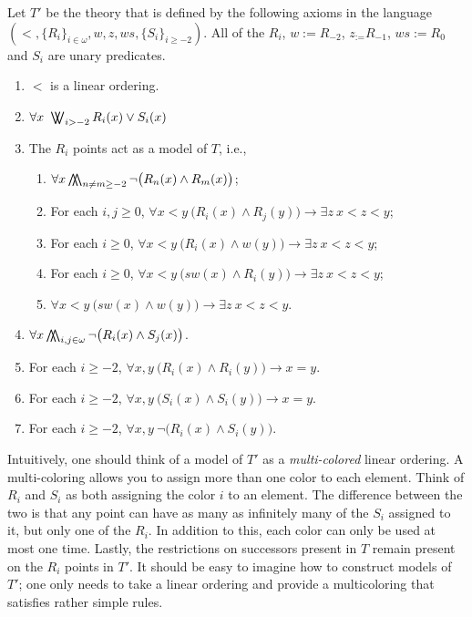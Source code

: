 \documentclass[11pt]{amsart}
\theoremstyle{definition}
\newcommand{\bigwwedge}{%
  \mathop{
    \mathchoice{\bigwedge\mkern-15mu\bigwedge}
               {\bigwedge\mkern-12.5mu\bigwedge}
               {\bigwedge\mkern-12.5mu\bigwedge}
               {\bigwedge\mkern-11mu\bigwedge}
    }
}
\newcommand{\bigvvee}{%
  \mathop{
    \mathchoice{\bigvee\mkern-15mu\bigvee}
               {\bigvee\mkern-12.5mu\bigvee}
               {\bigvee\mkern-12.5mu\bigvee}
               {\bigvee\mkern-11mu\bigvee}
    }
}
\begin{document}
\begin{definition}
    Let $T'$ be the theory that is defined by the following axioms in the language $(<,\{R_i\}_{i\in\omega},w,z,ws,\{S_i\}_{i\geq-2})$. All of the $R_i$, $w:=R_{-2}$, $z_:=R_{-1}$, $ws:=R_0$ and $S_i$ are unary predicates.
    \begin{enumerate}
        \item $<$ is a linear ordering.
        \item $\forall x ~ \bigvvee_{i>-2} R_i(x)\lor S_i(x)$
	\item The $R_i$ points act as a model of $T$, i.e.,
        \begin{enumerate}
            \item  $\forall x \bigwwedge_{n\neq m\geq -2} \lnot\big(R_n(x) \land R_m(x)\big)$;
            \item For each $i,j\geq 0$, $\forall x<y ~ \big(R_i(x) \land R_j(y)\big)\to \exists z ~ x<z<y$;
	    \item For each $i\geq 0$, $\forall x<y ~ \big(R_i(x) \land w(y)\big)\to \exists z ~ x<z<y$;
	    \item For each $i\geq 0$, $\forall x<y ~ \big(sw(x) \land R_i(y)\big)\to \exists z ~ x<z<y$;
            \item $\forall x<y ~ \big(sw(x) \land w(y)\big)\to \exists z ~ x<z<y$.
        \end{enumerate}
        \item $\forall x \bigwwedge_{i,j\in\omega} \lnot\big(R_i(x) \land S_j(x)\big)$.
        \item For each $i\geq-2$, $\forall x,y ~ \big(R_i(x)\land R_i(y)\big)\to x=y$.
        \item For each $i\geq-2$, $\forall x,y ~ \big(S_i(x)\land S_i(y)\big)\to x=y$.
        \item For each $i\geq-2$, $\forall x,y ~ \lnot\big( R_i(x)\land S_i(y)\big)$.
    \end{enumerate}
\end{definition}

Intuitively, one should think of a model of $T'$ as a \textit{multi-colored} linear ordering.
A multi-coloring allows you to assign more than one color to each element.
Think of $R_i$ and $S_i$ as both assigning the color $i$ to an element. The difference between the two is that any point can have as many as infinitely many of the $S_i$ assigned to it, but only one of the $R_i$.
In addition to this, each color can only be used at most one time.
Lastly, the restrictions on successors present in $T$ remain present on the $R_i$ points in $T'$.
It should be easy to imagine how to construct models of $T'$; one only needs to take a linear ordering and provide a multicoloring that satisfies rather simple rules.
\end{document}
